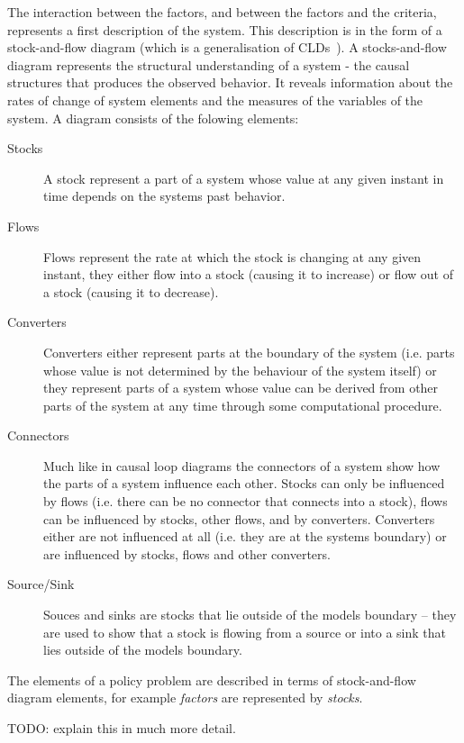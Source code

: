 The interaction between the factors, and between the factors and the
criteria, represents a first description of the system.
%
This description is in the form of a stock-and-flow diagram (which is a
generalisation of \aclp{CLD}~\cite{burns}). A stocks-and-flow diagram
represents the structural understanding of a system - the causal structures that
produces the observed behavior. It reveals information about the rates of change
of system elements and the measures of the variables of the system. A diagram
consists of the folowing elements:
\begin{description}
  \item[Stocks] A stock represent a part of a system whose value at any given
    instant in time depends on the systems past behavior. 
  \item[Flows] Flows represent the rate at which the stock is changing at any
    given instant, they either flow into a stock (causing it to increase) or flow
    out of a stock (causing it to decrease).
  \item[Converters] Converters either represent parts at the boundary of the
    system (i.e. parts whose value is not determined by the behaviour of the
    system itself) or they represent parts of a system whose value can be derived
    from other parts of the system at any time through some computational
    procedure.
  \item[Connectors] Much like in causal loop diagrams the connectors of a system
    show how the parts of a system influence each other. Stocks can only be
    influenced by flows (i.e. there can be no connector that connects into a
    stock), flows can be influenced by stocks, other flows, and by converters.
    Converters either are not influenced at all (i.e. they are at the systems
    boundary) or are influenced by stocks, flows and other converters.
  \item[Source/Sink] Souces and sinks are stocks that lie outside of the models
  boundary – they are used to show that a stock is flowing from a source or into
  a sink that lies outside of the models boundary.
\end{description}
The elements of a policy problem are described in terms of stock-and-flow
diagram elements, for example \emph{factors} are represented by \emph{stocks}.

TODO: explain this in much more detail.



